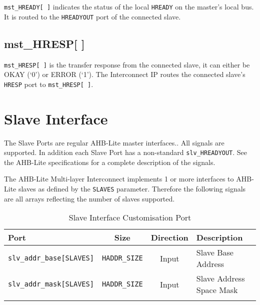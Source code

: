 \texttt{mst\_HREADY[\,]} indicates the status of the local \texttt{HREADY} on the master's
local bus. It is routed to the \texttt{HREADYOUT} port of the connected slave.

\subsection{mst\_HRESP[ ]}\label{mst_hresp}

\texttt{mst\_HRESP[\,]} is the transfer response from the connected slave, it can
either be OKAY (`0') or ERROR (`1'). The Interconnect IP routes the
connected slave's \texttt{HRESP} port to \texttt{mst\_HRESP[\,]}.

\section{Slave Interface}\label{slave-interface}

The Slave Ports are regular AHB-Lite master interfaces.. All signals are
supported. In addition each Slave Port has a non-standard
\texttt{slv\_HREADYOUT}. See the AHB-Lite specifications for a complete
description of the signals.

The AHB-Lite Multi-layer Interconnect implements 1 or more interfaces to AHB-Lite slaves
as defined by the \texttt{SLAVES} parameter. Therefore the following signals are all
arrays reflecting the number of slaves supported.

\begin{longtable}[]{@{}lccl@{}}
\toprule
Port & Size & Direction & Description\tabularnewline
\midrule
\endhead
\texttt{slv\_addr\_base[SLAVES]} & \texttt{HADDR\_SIZE} & Input  & Slave Base Address\tabularnewline
\texttt{slv\_addr\_mask[SLAVES]} & \texttt{HADDR\_SIZE} & Input  & Slave Address Space Mask\tabularnewline
\bottomrule
\caption{Slave Interface Customisation Port}
\end{longtable}

